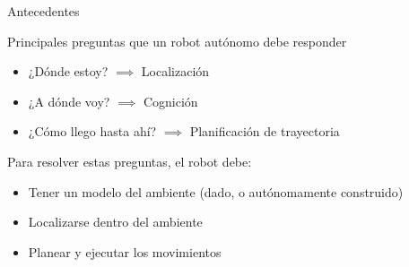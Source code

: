 \documentclass[
  24pt, %
  aspectratio=169, %
]{beamer}
\begin{document}
\begin{frame}{Antecedentes}
  
  Principales preguntas que un robot autónomo debe responder
  \bigskip %
  \begin{itemize}
  \item ¿Dónde estoy? $\implies$ Localización 
  \item ¿A dónde voy? $\implies$ Cognición
  \item ¿Cómo llego hasta ahí? $\implies$ Planificación de trayectoria
  \end{itemize}
  \pause
  \bigskip %
  Para resolver estas preguntas, el robot debe:
  \bigskip %
  \begin{itemize}
  \item Tener un modelo del ambiente (dado, o autónomamente construido)
  \item Localizarse dentro del ambiente
  \item Planear y ejecutar los movimientos
  \end{itemize}
  
\end{frame}
\end{document}
